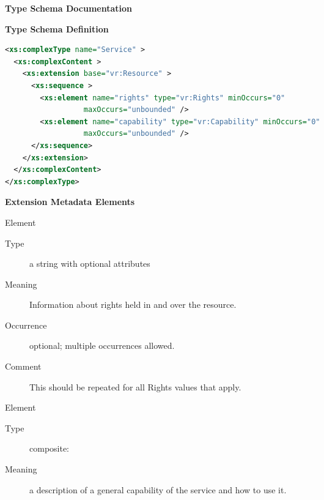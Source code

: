 \documentclass[11pt,a4paper]{ivoa}
\begin{document}
\begin{generated}
\begingroup
      	\renewcommand*\descriptionlabel[1]{%
      	\hbox to 5.5em{\emph{#1}\hfil}}\vspace{2ex}\noindent\textbf{ Type Schema Documentation}


\vspace{1ex}\noindent\textbf{ Type Schema Definition}

\begin{lstlisting}[language=XML,basicstyle=\footnotesize]
<xs:complexType name="Service" >
  <xs:complexContent >
    <xs:extension base="vr:Resource" >
      <xs:sequence >
        <xs:element name="rights" type="vr:Rights" minOccurs="0"
                  maxOccurs="unbounded" />
        <xs:element name="capability" type="vr:Capability" minOccurs="0"
                  maxOccurs="unbounded" />
      </xs:sequence>
    </xs:extension>
  </xs:complexContent>
</xs:complexType>
\end{lstlisting}

\vspace{0.5ex}\noindent\textbf{ Extension Metadata Elements}

\begingroup\small\begin{bigdescription}\item[Element \xmlel{rights}]
\begin{description}
\item[Type] a string with optional attributes
\item[Meaning] 
                       Information about rights held in and over the resource.
                     
\item[Occurrence] optional; multiple occurrences allowed.
\item[Comment] 
                       This should be repeated for all Rights values that apply.
                     

\end{description}
\item[Element \xmlel{capability}]
\begin{description}
\item[Type] composite: 
\item[Meaning] 
                        a description of a general capability of the
                        service and how to use it.
                     

\end{description}
\end{bigdescription}
\end{generated}
\end{document}
